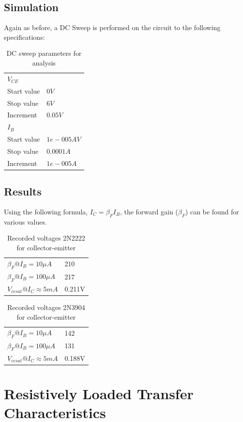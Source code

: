\documentclass[12pt]{article}
\begin{document}
\subsection{Simulation}
Again as before, a  DC Sweep is performed on the circuit to the following specifications:
\begin{table}[h]
\centering
\begin{tabular}{ll}
$V_{CE}$			&	\\
Start value		&$0V$\\
Stop value		&$6V$\\
Increment		&$0.05V$\\
$I_{B}$			&\\
Start value		&$1e-005AV$\\
Stop value		&$0.0001A$\\
Increment		&$1e-005A$
\end{tabular}
\caption{DC sweep parameters for analysis}
\end{table}
\subsection{Results}
Using the following formula, $I_C=\beta_FI_B$, the forward gain ($\beta_F$) can be found for various values.
\begin{table}[h]
\centering
\begin{tabular}{ll}
$\beta_{F} @ I_{B} = 10 \mu A$ & 210 \\
$\beta_{F} @ I_{B} = 100 \mu A$ & 217 \\
$V_{ce sat}@I_{C}\approx5mA $ & 0.211V
\end{tabular}
\caption{Recorded voltages  2N2222 for collector-emitter}
\end{table}
\begin{table}[h]
\centering
\begin{tabular}{ll}
$\beta_{F} @ I_{B} = 10 \mu A$ & 142 \\
$\beta_{F} @ I_{B} = 100 \mu A$ & 131 \\
$V_{ce sat}@I_{C}\approx5mA $ & 0.188V
\end{tabular}
\caption{Recorded voltages 2N3904 for collector-emitter}
\end{table}

\section{Resistively Loaded Transfer Characteristics}
\end{document}
